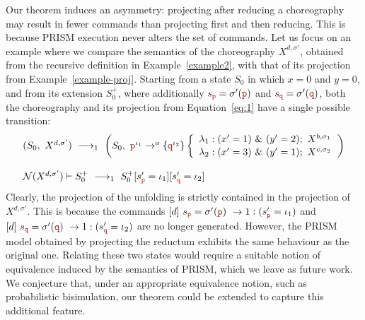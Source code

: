 \begin{rem}
  Our theorem induces an asymmetry: projecting after reducing a
  choreography may result in fewer commands than projecting first and
  then reducing. This is because PRISM execution never alters the set
  of commands.  Let us focus on an example where we compare the
  semantics of the choreography \(X^{d,\sigma'}\), obtained from the
  recursive definition in Example~\ref{example2}, with that of its
  projection from Example~\ref{example-proj}. Starting from a state
  \(S_0\) in which \(x=0\) and \(y=0\), and from its extension
  \(S_0^+\), where additionally \(s_{\nr}=\sigma'(\nr)\) and
  \(s_{\nrr}=\sigma'(\nrr)\), both the choreography and its projection
  from Equation~\ref{eq:1} have a single possible transition:
  \begin{displaymath}
    \begin{array}{lll}
      (S_0,\ X^{d,\sigma'})\red 1
      \left(S_0,\ \interactBasel{\nr^{\iota_1}}{a}{\nrr^{\iota_2}}
      \left\{
      \begin{array}{lll}
        \lambda_1 : (x'=1)\ \&\ (y'=2);\ X^{b,\sigma_1} \\[0.5mm]
        \lambda_2 : (x'=3)\ \&\ (y'=1);\ X^{c,\sigma_2}
      \end{array}
      \right.\right)
      \\\\
      \mathcal N(X^{d,\sigma'})\vdash S_0^{+}
      \red{1} S_0^{+}[s_{\nr}'=\iota_1][s_{\nrr}'=\iota_2]
    \end{array}
  \end{displaymath}
  Clearly, the projection of the unfolding is strictly contained in
  the projection of \(X^{d,\sigma'}\). This is because
  the commands
  \(\commandBase{d}{s_{\nr}=\sigma'(\nr)}{1:(s_{\nr}'=\iota_1)}\) and
  \(\commandBase{d}{s_{\nrr}=\sigma'(\nrr)}{1:(s_{\nrr}'=\iota_2)}\)
  are no longer generated.
  However, the PRISM model obtained by projecting the reductum
  exhibits the same behaviour as the original one.  Relating these two
  states would require a suitable notion of equivalence induced by the
  semantics of PRISM, which we leave as future work. We conjecture
  that, under an appropriate equivalence notion, such as probabilistic
  bisimulation, our theorem could be extended to capture this
  additional feature.
\end{rem}



